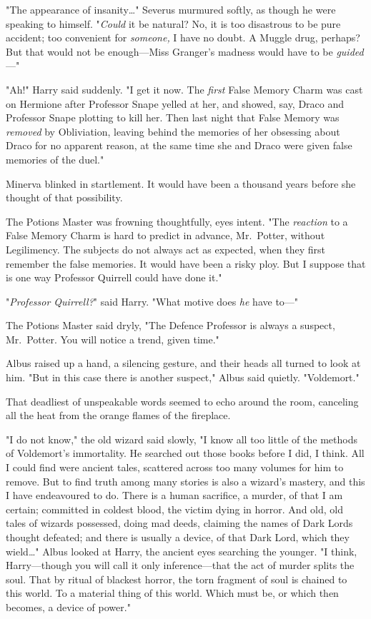"The appearance of insanity{\ldots}" Severus murmured softly, as though he were
speaking to himself. "\emph{Could} it be natural? No, it is too disastrous to
be pure accident; too convenient for \emph{someone,} I have no doubt. A Muggle
drug, perhaps? But that would not be enough---Miss Granger's madness would have
to be \emph{guided}---"

"Ah!" Harry said suddenly. "I get it now. The \emph{first} False Memory Charm
was cast on Hermione after Professor Snape yelled at her, and showed, say,
Draco and Professor Snape plotting to kill her. Then last night that False
Memory was \emph{removed} by Obliviation, leaving behind the memories of her
obsessing about Draco for no apparent reason, at the same time she and Draco
were given false memories of the duel."

Minerva blinked in startlement. It would have been a thousand years before she
thought of that possibility.

The Potions Master was frowning thoughtfully, eyes intent. "The \emph{reaction}
to a False Memory Charm is hard to predict in advance, Mr.~Potter, without
Legilimency. The subjects do not always act as expected, when they first
remember the false memories. It would have been a risky ploy. But I suppose
that is one way Professor Quirrell could have done it."

"\emph{Professor Quirrell?}" said Harry. "What motive does \emph{he} have to---"

The Potions Master said dryly, "The Defence Professor is always a suspect,
Mr.~Potter. You will notice a trend, given time."

Albus raised up a hand, a silencing gesture, and their heads all turned to look
at him. "But in this case there is another suspect," Albus said quietly.
"Voldemort."

That deadliest of unspeakable words seemed to echo around the room, canceling
all the heat from the orange flames of the fireplace.

"I do not know," the old wizard said slowly, "I know all too little of the
methods of Voldemort's immortality. He searched out those books before I did, I
think. All I could find were ancient tales, scattered across too many volumes
for him to remove. But to find truth among many stories is also a wizard's
mastery, and this I have endeavoured to do. There is a human sacrifice, a
murder, of that I am certain; committed in coldest blood, the victim dying in
horror. And old, old tales of wizards possessed, doing mad deeds, claiming the
names of Dark Lords thought defeated; and there is usually a device, of that
Dark Lord, which they wield{\ldots}" Albus looked at Harry, the ancient eyes
searching the younger. "I think, Harry---though you will call it only
inference---that the act of murder splits the soul. That by ritual of blackest
horror, the torn fragment of soul is chained to this world. To a material thing
of this world. Which must be, or which then becomes, a device of power."

